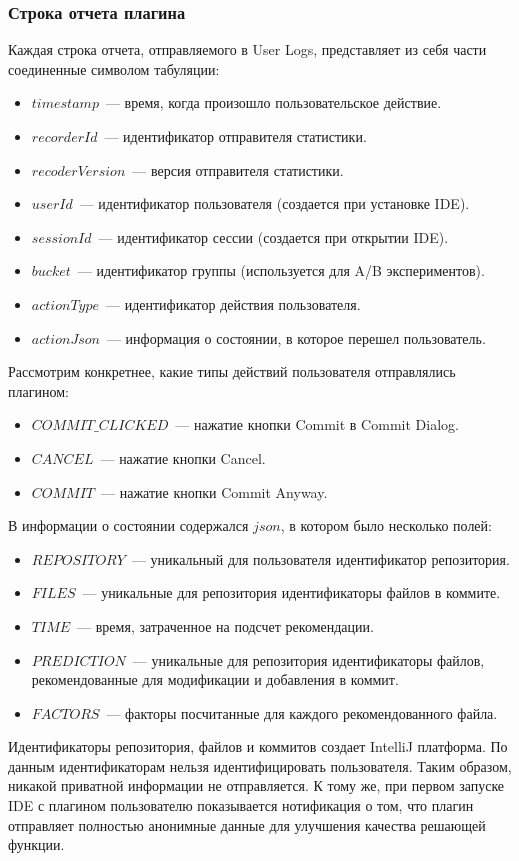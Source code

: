 \subsubsection{Строка отчета плагина}\label{report-line}
Каждая строка отчета, отправляемого в User Logs, представляет из себя части соединенные символом табуляции:
    \begin{itemize}
        \item $timestamp$~--- время, когда произошло пользовательское действие.
        \item $recorderId$~--- идентификатор отправителя статистики.
        \item $recoderVersion$~--- версия отправителя статистики.
        \item $userId$~--- идентификатор пользователя (создается при установке IDE).
        \item $sessionId$~--- идентификатор сессии (создается при открытии IDE).
        \item $bucket$~--- идентификатор группы (используется для A/B экспериментов).
        \item $actionType$~--- идентификатор действия пользователя.
        \item $actionJson$~--- информация о состоянии, в которое перешел пользователь.
    \end{itemize}

Рассмотрим конкретнее, какие типы действий пользователя отправлялись плагином:
    \begin{itemize}
        \item $COMMIT\_CLICKED$~--- нажатие кнопки Commit в Commit Dialog.
        \item $CANCEL$~--- нажатие кнопки Cancel.
        \item $COMMIT$~--- нажатие кнопки Commit Anyway.
    \end{itemize}

В информации о состоянии содержался $json$, в котором было несколько полей:
    \begin{itemize}
        \item $REPOSITORY$~--- уникальный для пользователя идентификатор репозитория.
        \item $FILES$~--- уникальные для репозитория идентификаторы файлов в коммите.
        \item $TIME$~--- время, затраченное на подсчет рекомендации.
        \item $PREDICTION$~--- уникальные для репозитория идентификаторы файлов, рекомендованные для модификации и добавления в коммит.
        \item $FACTORS$~--- факторы посчитанные для каждого рекомендованного файла.
    \end{itemize}
Идентификаторы репозитория, файлов и коммитов создает IntelliJ платформа. По данным идентификаторам нельзя идентифицировать пользователя. Таким образом, никакой приватной информации не отправляется. К тому же, при первом запуске IDE с плагином пользователю показывается нотификация о том, что плагин отправляет полностью анонимные данные для улучшения качества решающей функции.
